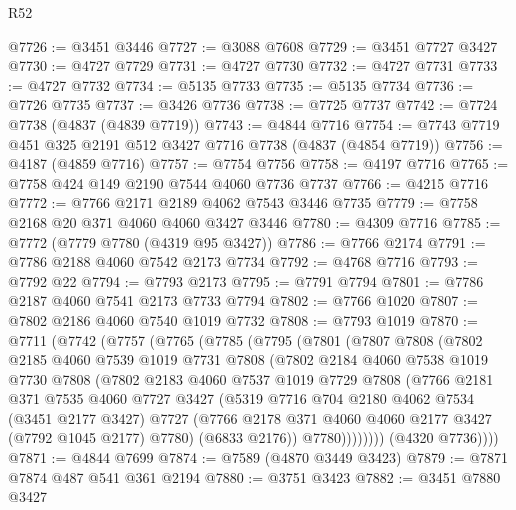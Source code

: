 \begin{lexlean}{R52}
\begin{coremodule}
@7726 := @3451 @3446
@7727 := @3088 @7608
@7729 := @3451 @7727 @3427
@7730 := @4727 @7729
@7731 := @4727 @7730
@7732 := @4727 @7731
@7733 := @4727 @7732
@7734 := @5135 @7733
@7735 := @5135 @7734
@7736 := @7726 @7735
@7737 := @3426 @7736
@7738 := @7725 @7737
@7742 := @7724 @7738 (@4837 (@4839 @7719))
@7743 := @4844 @7716
@7754 := @7743 @7719 @451 @325 @2191 @512 @3427 @7716 @7738 (@4837 (@4854 @7719))
@7756 := @4187 (@4859 @7716)
@7757 := @7754 @7756
@7758 := @4197 @7716
@7765 := @7758 @424 @149 @2190 @7544 @4060 @7736 @7737
@7766 := @4215 @7716
@7772 := @7766 @2171 @2189 @4062 @7543 @3446 @7735
@7779 := @7758 @2168 @20 @371 @4060 @4060 @3427 @3446
@7780 := @4309 @7716
@7785 := @7772 (@7779 @7780 (@4319 @95 @3427))
@7786 := @7766 @2174
@7791 := @7786 @2188 @4060 @7542 @2173 @7734
@7792 := @4768 @7716
@7793 := @7792 @22
@7794 := @7793 @2173
@7795 := @7791 @7794
@7801 := @7786 @2187 @4060 @7541 @2173 @7733 @7794
@7802 := @7766 @1020
@7807 := @7802 @2186 @4060 @7540 @1019 @7732
@7808 := @7793 @1019
@7870 := @7711
    (@7742
      (@7757
        (@7765
          (@7785
            (@7795
              (@7801
                (@7807
                  @7808
                  (@7802
                    @2185
                    @4060
                    @7539
                    @1019
                    @7731
                    @7808
                    (@7802
                      @2184
                      @4060
                      @7538
                      @1019
                      @7730
                      @7808
                      (@7802
                        @2183
                        @4060
                        @7537
                        @1019
                        @7729
                        @7808
                        (@7766
                          @2181
                          @371
                          @7535
                          @4060
                          @7727
                          @3427
                          (@5319
                            @7716
                            @704
                            @2180
                            @4062
                            @7534
                            (@3451 @2177 @3427)
                            @7727
                            (@7766 @2178 @371 @4060 @4060 @2177 @3427 (@7792 @1045 @2177) @7780)
                            (@6833 @2176))
                          @7780))))))))
          (@4320 @7736))))
@7871 := @4844 @7699
@7874 := @7589 (@4870 @3449 @3423)
@7879 := @7871 @7874 @487 @541 @361 @2194
@7880 := @3751 @3423
@7882 := @3451 @7880 @3427

\end{coremodule}
\end{lexlean}
